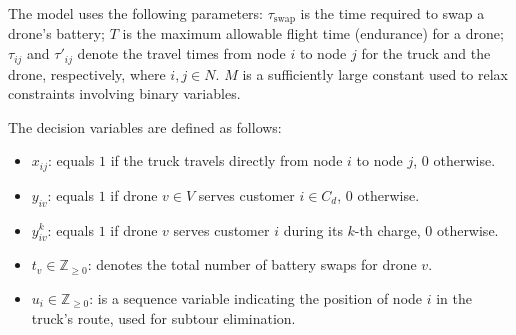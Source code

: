 \documentclass[3p, authoryear, 11pt]{elsarticle}
\begin{document}





The model uses the following parameters: $\tau_{\text{swap}}$ is the time required to swap a drone’s battery; $T$ is the maximum allowable flight time (endurance) for a drone; $\tau_{ij}$ and $\tau'_{ij}$ denote the travel times from node $i$ to node $j$ for the truck and the drone, respectively, where $i, j \in N$. $M$ is a sufficiently large constant used to relax constraints involving binary variables.

The decision variables are defined as follows:
\begin{itemize}
    \item $x_{ij}$: equals $1$ if the truck travels directly from node $i$ to node $j$, 0 otherwise.
    \item $y_{iv}$: equals $1$ if drone $v \in V$ serves customer $i \in C_d$, 0 otherwise.
    \item $y^k_{iv}$: equals $1$ if drone $v$ serves customer $i$ during its $k$-th charge, 0 otherwise.
    \item $t_v \in \mathbb{Z}_{\geq 0}$: denotes the total number of battery swaps for drone $v$.
    \item $u_i \in \mathbb{Z}_{\geq 0}$: is a sequence variable indicating the position of node $i$ in the truck’s route, used for subtour elimination.
\end{itemize}
\end{document}
